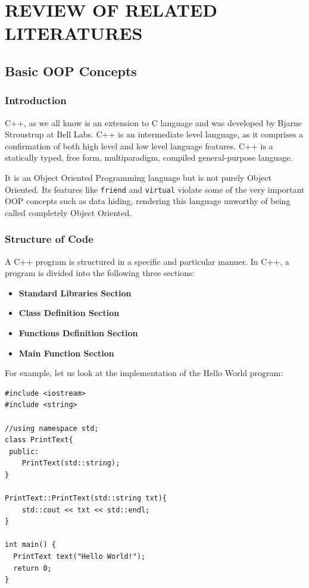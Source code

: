 \documentclass[main]{subfiles}
\begin{document}
\chapter{REVIEW OF RELATED LITERATURES}

\section{Basic OOP Concepts}
\subsection{Introduction}
C++, as we all know is an extension to C language and was developed by Bjarne Stroustrup at Bell Labs. C++ is an intermediate level language, as it comprises a confirmation of both high level and low level language features. C++ is a statically typed, free form, multiparadigm, compiled general-purpose language.

It is an Object Oriented Programming language but is not purely Object Oriented. Its features like \texttt{friend} and \texttt{virtual} violate some of the very important OOP concepts such as data hiding, rendering this language unworthy of being called completely Object Oriented.


\subsection{Structure of Code}
A C++ program is structured in a specific and particular manner. In C++, a program is divided into the following three sections:
\begin{itemize}
    \item\textbf{Standard Libraries Section}
    \item\textbf{Class Definition Section}
    \item\textbf{Functions Definition Section}
    \item\textbf{Main Function Section}
\end{itemize}

For example, let us look at the implementation of the Hello World program:
\begin{verbatim}
#include <iostream>
#include <string>

//using namespace std;
class PrintText{
 public:
    PrintText(std::string);
}

PrintText::PrintText(std::string txt){
    std::cout << txt << std::endl;
}

int main() {
  PrintText text("Hello World!");
  return 0;
}
\end{verbatim}
\end{document}
